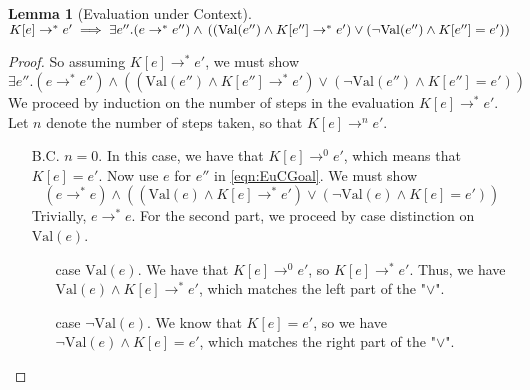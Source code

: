 \documentclass[a4paper, 11pt]{report}
\newtheorem{lemma}[theorem]{Lemma}
\theoremstyle{definition}
\newcommand{\expr}{e}
\newcommand{\elctx}{K}
\newcommand{\step}{\rightarrow}
\newcommand{\stepS}{\rightarrow^*}
\newcommand{\Val}[1]{\mathrm{Val}(#1)}
\begin{document}
\begin{lemma}[Evaluation under Context]\label{lem:EuC}
  $ \elctx[\expr] \stepS \expr' \implies 
    \exists \expr'' . (\expr \stepS \expr'') \land\\
    \left( (\Val{\expr''} \land \elctx[\expr''] \stepS \expr') \lor
    (\neg \Val{\expr''} \land \elctx[\expr''] = \expr') \right)
    $
\end{lemma}
\begin{proof}
  So assuming $\elctx[\expr] \stepS \expr'$, we must show
  \begin{equation}\label{eqn:EuCGoal}
    \exists \expr'' . (\expr \stepS \expr'') \land 
    \left( (\Val{\expr''} \land \elctx[\expr''] \stepS \expr') \lor
    (\neg \Val{\expr''} \land \elctx[\expr''] = \expr') \right)
  \end{equation}
  We proceed by induction on the number of steps in the evaluation $\elctx[\expr] \stepS \expr'$. Let $n$ denote the number of steps taken, so that $\elctx[\expr] \step^n \expr'$.
  \begin{itemize}
    \item[B.C.] $n = 0$. In this case, we have that $\elctx[\expr] \step^0 \expr'$, which means that $\elctx[\expr] = \expr'$. Now use $\expr$ for $\expr''$ in \ref{eqn:EuCGoal}. We must show
    \begin{equation*}
      (\expr \stepS \expr) \land 
      \left( (\Val{\expr} \land \elctx[\expr] \stepS \expr') \lor
      (\neg \Val{\expr} \land \elctx[\expr] = \expr') \right)
    \end{equation*}
    Trivially, $\expr \stepS \expr$. For the second part, we proceed by case distinction on $\Val{\expr}$.
    \begin{itemize}
      \item[case] $\Val{\expr}$. We have that $\elctx[\expr] \step^0 \expr'$, so $\elctx[\expr] \stepS \expr'$. Thus, we have $\Val{\expr} \land \elctx[\expr] \stepS \expr'$, which matches the left part of the "$\lor$".
      \item[case] $\neg \Val{\expr}$. We know that $\elctx[\expr] = \expr'$, so we have $\neg \Val{\expr} \land \elctx[\expr] = \expr'$, which matches the right part of the "$\lor$".
    \end{itemize}
    

\end{itemize}
\end{proof}
\end{document}
